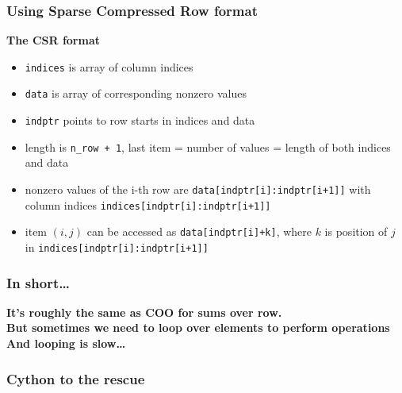 \documentclass[xcolor=dvipsnames]{beamer}
\begin{document}
\begin{frame}
\frametitle{Using Sparse Compressed Row format}
{\bf \color{Blue} The CSR format}

\begin{itemize}[label={$\bullet$}]
\item \texttt{indices} is array of column indices
\item \texttt{data} is array of corresponding nonzero values
\item \texttt{indptr} points to row starts in indices and data
\item length is \texttt{n\_row + 1}, last item = number of values = length of both indices and data
\item nonzero values of the i-th row are \texttt{data[indptr[i]:indptr[i+1]]} with column indices \texttt{indices[indptr[i]:indptr[i+1]]}
\item item $(i, j)$ can be accessed as \texttt{data[indptr[i]+k]}, where $k$ is position of $j$ in \texttt{indices[indptr[i]:indptr[i+1]]}
\end{itemize}
\end{frame}


\begin{frame}
\frametitle{In short\dots}
{\Large \bf \color{Blue} It's roughly the same as COO for sums over row.}\\
\vspace{1em}
{\Large \bf \color{Blue} But sometimes we need to loop over
elements to perform operations}\\
\vspace{1em}
{\Large \bf \color{Blue} \flushleft And looping is slow\dots}
\end{frame}

\begin{frame}
\frametitle{Cython to the rescue}
\end{frame}
\end{document}

